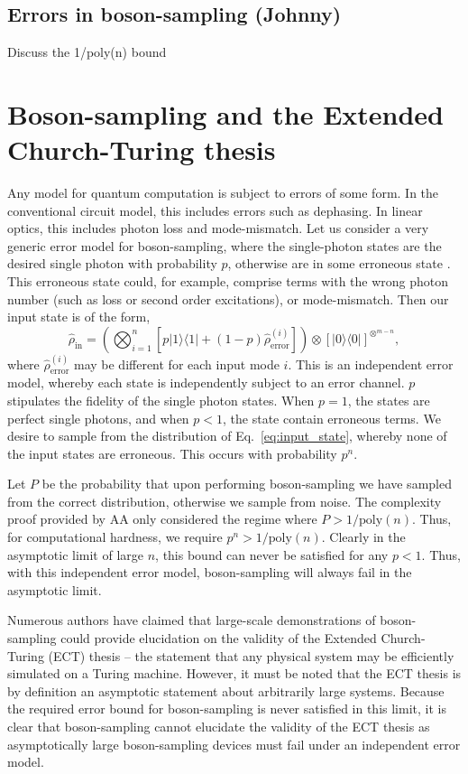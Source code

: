 \documentclass[aps,pra,twocolumn,amsmath,amssymb,nofootinbib,superscriptaddress]{revtex4}
\newcommand{\bra}[1]{\langle#1|}
\newcommand{\ket}[1]{|#1\rangle}
\begin{document}
\subsection{Errors in boson-sampling (Johnny)}
Discuss the 1/poly(n) bound

\section{Boson-sampling and the Extended Church-Turing thesis}

Any model for quantum computation is subject to errors of some form. In the conventional circuit model, this includes errors such as dephasing. In linear optics, this includes photon loss and mode-mismatch. Let us consider a very generic error model for boson-sampling, where the single-photon states are the desired single photon with probability $p$, otherwise are in some erroneous state \cite{bib:BSECT}. This erroneous state could, for example, comprise terms with the wrong photon number (such as loss or second order excitations), or mode-mismatch. Then our input state is of the form,
\begin{equation} \label{eq:error_model}
\hat\rho_\mathrm{in} =\left(\bigotimes_{i=1}^n[p\ket{1}\bra{1} + (1-p)\hat\rho_\mathrm{error}^{(i)}]\right) \otimes [\ket{0}\bra{0}]^{\otimes^{m-n}},
\end{equation}
where \mbox{$\hat\rho_\mathrm{error}^{(i)}$} may be different for each input mode $i$. This is an independent error model, whereby each state is independently subject to an error channel. $p$ stipulates the fidelity of the single photon states. When \mbox{$p=1$}, the states are perfect single photons, and when \mbox{$p<1$}, the state contain erroneous terms. We desire to sample from the distribution of Eq.~\ref{eq:input_state}, whereby none of the input states are erroneous. This occurs with probability $p^n$.

Let $P$ be the probability that upon performing boson-sampling we have sampled from the correct distribution, otherwise we sample from noise. The complexity proof provided by AA only considered the regime where \mbox{$P>1/\mathrm{poly}(n)$}. Thus, for computational hardness, we require \mbox{$p^n > 1/\mathrm{poly}(n)$}. Clearly in the asymptotic limit of large $n$, this bound can never be satisfied for any $p<1$. Thus, with this independent error model, boson-sampling will always fail in the asymptotic limit.

Numerous authors \cite{bib:Broome20122012, bib:ShenDuan13, bib:AA13response, bib:Shchesnovich13, bib:Molmer13} have claimed that large-scale demonstrations of boson-sampling could provide elucidation on the validity of the Extended Church-Turing (ECT) thesis -- the statement that any physical system may be efficiently simulated on a Turing machine. However, it must be noted that the ECT thesis is by definition an asymptotic statement about arbitrarily large systems. Because the required error bound for boson-sampling is never satisfied in this limit, it is clear that boson-sampling cannot elucidate the validity of the ECT thesis as asymptotically large boson-sampling devices must fail under an independent error model.
\end{document}
